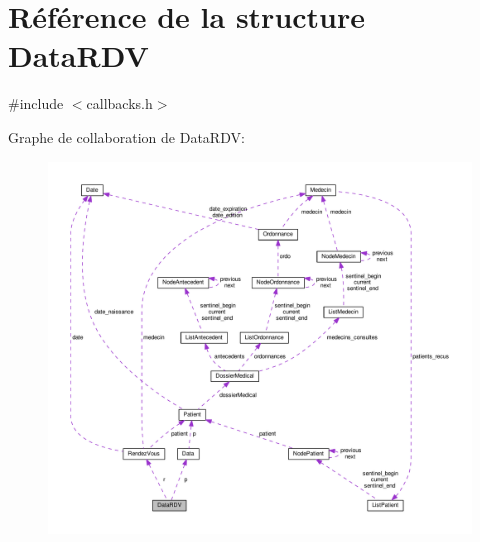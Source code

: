 \hypertarget{struct_data_r_d_v}{\section{Référence de la structure Data\-R\-D\-V}
\label{struct_data_r_d_v}
}


{\ttfamily \#include $<$callbacks.\-h$>$}



Graphe de collaboration de Data\-R\-D\-V\-:
\nopagebreak
\begin{figure}[H]
\begin{center}
\leavevmode
\includegraphics[width=350pt]{struct_data_r_d_v__coll__graph}
\end{center}
\end{figure}
